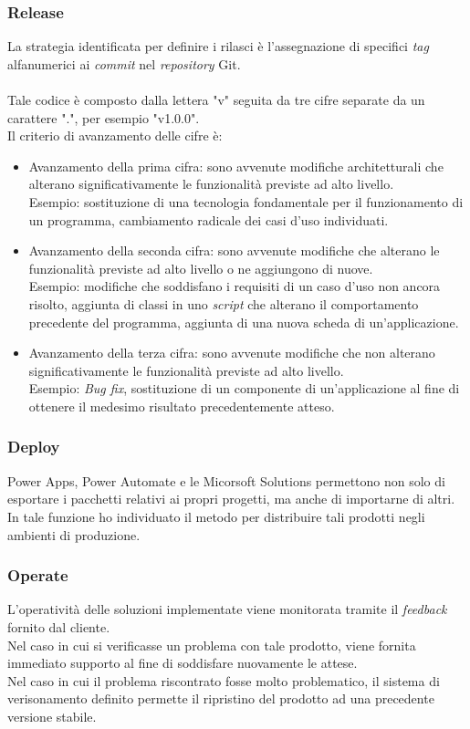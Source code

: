 \subsubsection*{Release}
La strategia identificata per definire i rilasci è l'assegnazione di specifici \emph{tag} alfanumerici ai \emph{commit} nel \emph{repository} Git.\\\\
Tale codice è composto dalla lettera "v" seguita da tre cifre separate da un carattere ".", per esempio "v1.0.0".\\
Il criterio di avanzamento delle cifre è: 
\begin{itemize}
    \item Avanzamento della prima cifra: sono avvenute modifiche architetturali che alterano significativamente le funzionalità previste ad alto livello.\\
    Esempio: sostituzione di una tecnologia fondamentale per il funzionamento di un programma, cambiamento radicale dei casi d'uso individuati.  
    \item Avanzamento della seconda cifra: sono avvenute modifiche che alterano le funzionalità previste ad alto livello o ne aggiungono di nuove.\\
    Esempio: modifiche che soddisfano i requisiti di un caso d'uso non ancora risolto, aggiunta di classi in uno \emph{script} che alterano il comportamento precedente del programma, aggiunta di una nuova scheda di un'applicazione.
    \item Avanzamento della terza cifra: sono avvenute modifiche che non alterano significativamente le funzionalità previste ad alto livello.\\
    Esempio: \emph{Bug fix}, sostituzione di un componente di un'applicazione al fine di ottenere il medesimo risultato precedentemente atteso. 
\end{itemize}

\subsubsection*{Deploy}
Power Apps, Power Automate e le Micorsoft Solutions permettono non solo di esportare i pacchetti relativi ai propri progetti, ma anche di importarne di altri.\\
In tale funzione ho individuato il metodo per distribuire tali prodotti negli ambienti di produzione. 

\subsubsection*{Operate}
L'operatività delle soluzioni implementate viene monitorata tramite il \emph{feedback} fornito dal cliente.\\
Nel caso in cui si verificasse un problema con tale prodotto, viene fornita immediato supporto al fine di soddisfare nuovamente le attese.\\
Nel caso in cui il problema riscontrato fosse molto problematico, il sistema di verisonamento definito permette il ripristino del prodotto ad una precedente versione stabile. 

